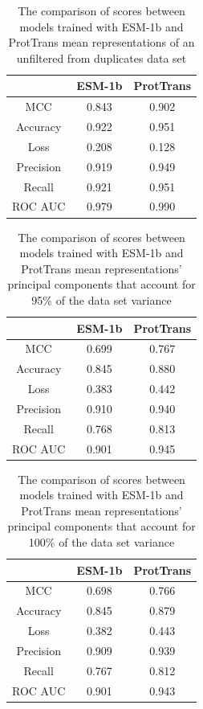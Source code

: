 \documentclass[12pt]{article}
\begin{document}
	\begin{table}[h!]
		\caption{The comparison of scores between models trained with ESM-1b
		and ProtTrans mean representations of an unfiltered from 
		duplicates data set}
		\vspace{0.2cm}
		\centering
		\begin{tabular}{ | c | c c | }
			\hline 
						
			& ESM-1b & ProtTrans \\
			\hline 
			MCC & 0.843 & 0.902 \\
			Accuracy & 0.922 & 0.951 \\
			Loss & 0.208 & 0.128 \\
			Precision & 0.919 & 0.949 \\
			Recall & 0.921 & 0.951 \\
			ROC AUC & 0.979 & 0.990 \\
			\hline    
		\end{tabular}
		\label{table:comparisonESMandPTdup}
	\end{table}

	\begin{table}[h!]
		\caption{The comparison of scores between models trained with ESM-1b
		and ProtTrans mean representations' principal components 
		that account for 95\% of the data set variance}
		\vspace{0.2cm}
		\centering
		\begin{tabular}{ | c | c c | }
			\hline 
						
			& ESM-1b & ProtTrans \\
			\hline 
			MCC & 0.699 & 0.767 \\
			Accuracy & 0.845 & 0.880 \\
			Loss & 0.383 & 0.442 \\
			Precision & 0.910 & 0.940 \\
			Recall & 0.768 & 0.813 \\
			ROC AUC & 0.901 & 0.945 \\
			\hline    
		\end{tabular}
		\label{table:comparisonESMandPTPC95}
	\end{table}

	\begin{table}[h!]
		\caption{The comparison of scores between models trained with ESM-1b
		and ProtTrans mean representations' principal components 
		that account for 100\% of the data set variance}
		\vspace{0.2cm}
		\centering
		\begin{tabular}{ | c | c c | }
			\hline 
						
			& ESM-1b & ProtTrans \\
			\hline 
			MCC & 0.698 & 0.766 \\
			Accuracy & 0.845 & 0.879 \\
			Loss & 0.382 & 0.443 \\
			Precision & 0.909 & 0.939 \\
			Recall & 0.767 & 0.812 \\
			ROC AUC & 0.901 & 0.943 \\
			\hline    
		\end{tabular}
		\label{table:comparisonESMandPTPC100}
	\end{table}
\end{document}
